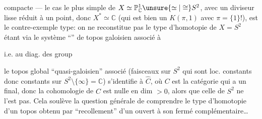 
compacte --- le cas le plus simple de $X\simeq\mathbb P^1_{\mathbb C}\unsure{\simeq|\cong}S^2$, avec un diviseur lisse réduit à un point, donc $X^{*}\simeq\mathbb C$ (qui est bien un $K(\pi,1)$ avec $\pi=\{1\}$!), est le contre-exemple type: on ne reconstitue pas le type d'homotopie de $X=S^2$   étant   via le système ``'' de topos galoisien associé à


i.e. au diag.
des group

 le topos global ``quasi-galoisien'' associé (faisceaux sur $S^2$ qui sont loc. constants donc constants sur $S^2\setminus\{\infty\}=\mathbb C$) s'identifie à $\widehat C$, où $C$ est la catégorie
\diagram{\begin{tikzcd}[ampersand replacement=\&]\bullet\arrow[r]\&\bullet\end{tikzcd}}
qui a un  final, donc la cohomologie de $\widehat C$ est nulle en dim $>0$, alors que celle de $S^2$ ne l'est pas. Cela soulève la question générale de comprendre le type d'homotopie d'un topos obtenu par ``recollement'' d'un ouvert à son fermé complémentaire\ldots

